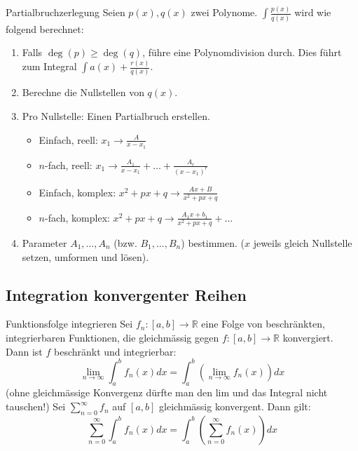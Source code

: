 \documentclass[a4paper,fontsize = 7pt]{scrartcl}
\def\limn{\lim_{n\to \infty}}
\def\sumn{\sum_{n=0}^\infty}
\def\R{\mathbb{R}}
\begin{document}
\begin{mainbox}{Partialbruchzerlegung}
  \vspace{-4pt}
 Seien $p(x), q(x)$ zwei Polynome. $\int \frac{p(x)}{q(x)}$ wird wie folgend berechnet:
 \begin{enumerate}
  \item Falls $\deg(p) \ge \deg(q)$, führe eine Polynomdivision durch. Dies führt zum Integral $\int a(x) + \frac{r(x)}{q(x)}$.
  \item Berechne die Nullstellen von $q(x)$.
  \item Pro Nullstelle: Einen Partialbruch erstellen.
  \begin{itemize}[left=0pt]
   \item Einfach, reell: $x_1 \to \frac{A}{x - x_1}$
   \item $n$-fach, reell: $x_1 \to \frac{A_1}{x - x_1} + \ldots + \frac{A_r}{(x-x_1)^r}$ 
   \item Einfach, komplex: $x^2 + px + q \to \frac{Ax + B} {x^2 + px + q}$
   \item $n$-fach, komplex: $x^2 + px + q \to \frac{A_1x+b_1}{x^2+px+q} + \ldots$
  \end{itemize}
  \item Parameter $A_1, \ldots, A_n$ (bzw. $B_1, \ldots, B_n$) bestimmen. ($x$ jeweils gleich Nullstelle setzen, umformen und lösen).

 \end{enumerate}
 \vspace{-10pt}
\end{mainbox}

\subsection{Integration konvergenter Reihen}

\begin{mainbox}{Funktionsfolge integrieren}
  \vspace{-4pt}
  Sei $f_n: [a, b] \to \R$ eine Folge von beschränkten, integrierbaren Funktionen, die gleichmässig gegen $f: [a,b] \to \R$ konvergiert.
  Dann ist $f$ beschränkt und integrierbar:
  $$\limn \int_a^b f_n(x)dx =\int_a^b \left(\limn f_n(x)\right)dx$$
  (ohne gleichmässige Konvergenz dürfte man den lim und das Integral nicht tauschen!)
  Sei $\sumn f_n$ auf $[a, b]$ gleichmässig konvergent. Dann gilt:
  $$\sumn \int_a^b f_n(x)dx = \int_a^b \left(\sumn f_n(x)\right) dx$$
  \vspace{-12pt}
\end{mainbox}
\end{document}
